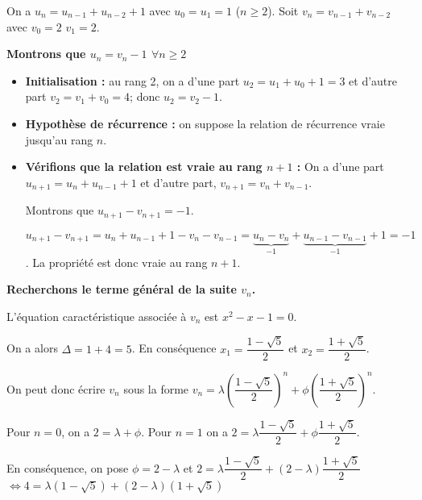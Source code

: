 \documentclass[10pt,fleqn]{article} %
\begin{document}

\vspace{4cm}
\pagestyle{fancy}
\thispagestyle{plain}


\def\columnseprulecolor{\color{ocre}}
\setlength{\columnseprule}{0.4pt} 
\ifprof
\else
\begin{multicols}{2}
\fi
On a $u_n = u_{n-1} + u_{n-2}+1$ avec $u_0=u_1=1$ ($n \geq 2$).
Soit $v_{n} = v_{n-1} + v_{n-2}$ avec $v_0=2$ $v_1=2$.

\textbf{Montrons que $u_n = v_n-1$ $\forall n\geq 2$}

\begin{itemize}
\item \textbf{Initialisation :} au rang 2, on a d'une part $u_2 = u_{1} + u_{0}+1=3$ et d'autre part $v_2 = v_{1} + v_{0} = 4$; donc $u_2 = v_2-1$.

\item \textbf{Hypothèse de récurrence :} on suppose la relation de récurrence vraie jusqu'au rang $n$.

\item \textbf{Vérifions que la relation est vraie au rang $n+1$ :}
On a d'une part $u_{n+1} = u_{n} + u_{n-1}+1$ et d'autre part, $v_{n+1} = v_{n} + v_{n-1}$. 

Montrons que  $u_{n+1} - v_{n+1}=-1$.

$u_{n+1} - v_{n+1} = u_{n} + u_{n-1}+1 -  v_{n}  -v_{n-1} =  \underbrace{u_{n}-  v_{n}}_{-1}+\underbrace{u_{n-1}-  v_{n-1}}_{-1}+1  =-1$. La propriété est donc vraie au rang $n+1$.

\end{itemize}

\textbf{Recherchons le terme général de la suite $v_n$.}

L'équation caractéristique associée à $v_n$ est $x^2 -x -1=0$. 

On a alors $\Delta = 1+4 = 5$. En conséquence $x_1 = \dfrac{1-\sqrt{5}}{2}$ et $x_2 = \dfrac{1+\sqrt{5}}{2}$.


On peut donc écrire $v_n$ sous la forme $v_n=\lambda \left(\dfrac{1-\sqrt{5}}{2}\right)^n+\phi \left(\dfrac{1+\sqrt{5}}{2}\right)^n$.

Pour $n=0$, on a $2=\lambda+\phi$. Pour $n=1$ on a $2=\lambda \dfrac{1-\sqrt{5}}{2}+\phi \dfrac{1+\sqrt{5}}{2}$.

En conséquence, on pose $\phi=2-\lambda$ et 
$2=\lambda \dfrac{1-\sqrt{5}}{2}+\left(2-\lambda\right) \dfrac{1+\sqrt{5}}{2}$
$\Leftrightarrow 4=\lambda (1-\sqrt{5})+\left(2-\lambda\right) (1+\sqrt{5})$


\end{multicols}
\end{document}
